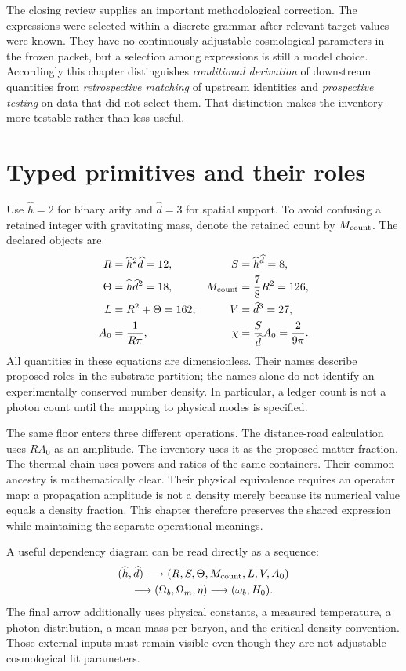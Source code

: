 The closing review supplies an important methodological correction. The expressions were selected within a discrete grammar after relevant target values were known. They have no continuously adjustable cosmological parameters in the frozen packet, but a selection among expressions is still a model choice. Accordingly this chapter distinguishes \emph{conditional derivation} of downstream quantities from \emph{retrospective matching} of upstream identities and \emph{prospective testing} on data that did not select them. That distinction makes the inventory more testable rather than less useful.

\section{Typed primitives and their roles}
Use $\widehat h=2$ for binary arity and $\widehat d=3$ for spatial support. To avoid confusing a retained integer with gravitating mass, denote the retained count by $M_{\rm count}$. The declared objects are
\begin{align}
 R&=\widehat h^2\widehat d=12,& S&=\widehat h^{\widehat d}=8,\label{c8:primitive1}\\
 \Theta&=\widehat h\widehat d^2=18,&M_{\rm count}&=\frac78R^2=126,\label{c8:primitive2}\\
 L&=R^2+\Theta=162,&V&=\widehat d^3=27,\label{c8:primitive3}\\
 A_0&=\frac1{R\pi},&\chi&=\frac{S}{\widehat d}A_0=\frac2{9\pi}.
 \label{c8:primitive4}
\end{align}
All quantities in these equations are dimensionless. Their names describe proposed roles in the substrate partition; the names alone do not identify an experimentally conserved number density. In particular, a ledger count is not a photon count until the mapping to physical modes is specified.

The same floor enters three different operations. The distance-road calculation uses $RA_0$ as an amplitude. The inventory uses it as the proposed matter fraction. The thermal chain uses powers and ratios of the same containers. Their common ancestry is mathematically clear. Their physical equivalence requires an operator map: a propagation amplitude is not a density merely because its numerical value equals a density fraction. This chapter therefore preserves the shared expression while maintaining the separate operational meanings.

A useful dependency diagram can be read directly as a sequence:
\begin{equation}
 \begin{gathered}
 (\widehat h,\widehat d)\longrightarrow(R,S,\Theta,M_{\rm count},L,V,A_0)\\
 \longrightarrow(\Omega_b,\Omega_m,\eta)\longrightarrow(\omega_b,H_0).
 \end{gathered}
 \label{c8:dependency}
\end{equation}
The final arrow additionally uses physical constants, a measured temperature, a photon distribution, a mean mass per baryon, and the critical-density convention. Those external inputs must remain visible even though they are not adjustable cosmological fit parameters.

